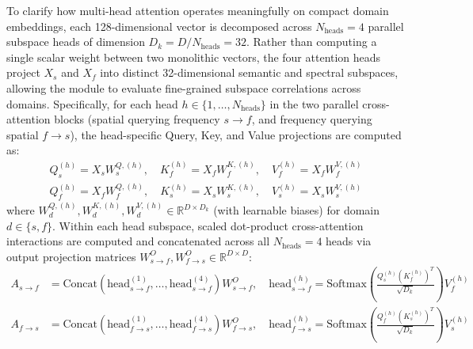 \documentclass[fleqn,10pt]{wlscirep}
\begin{document}
To clarify how multi-head attention operates meaningfully on compact domain embeddings, each 128-dimensional vector is decomposed across $N_{\text{heads}} = 4$ parallel subspace heads of dimension $D_k = D / N_{\text{heads}} = 32$. Rather than computing a single scalar weight between two monolithic vectors, the four attention heads project $X_s$ and $X_f$ into distinct 32-dimensional semantic and spectral subspaces, allowing the module to evaluate fine-grained subspace correlations across domains. Specifically, for each head $h \in \{1, \dots, N_{\text{heads}}\}$ in the two parallel cross-attention blocks (spatial querying frequency $s \to f$, and frequency querying spatial $f \to s$), the head-specific Query, Key, and Value projections are computed as:
\begin{align}
Q_s^{(h)} = X_s W_s^{Q,(h)}, \quad K_f^{(h)} = X_f W_f^{K,(h)}, \quad V_f^{(h)} = X_f W_f^{V,(h)} \\
Q_f^{(h)} = X_f W_f^{Q,(h)}, \quad K_s^{(h)} = X_s W_s^{K,(h)}, \quad V_s^{(h)} = X_s W_s^{V,(h)}
\end{align}
where $W_d^{Q,(h)}, W_d^{K,(h)}, W_d^{V,(h)} \in \mathbb{R}^{D \times D_k}$ (with learnable biases) for domain $d \in \{s, f\}$. Within each head subspace, scaled dot-product cross-attention interactions are computed and concatenated across all $N_{\text{heads}} = 4$ heads via output projection matrices $W_{s \to f}^O, W_{f \to s}^O \in \mathbb{R}^{D \times D}$:
\begin{align}
A_{s \to f} &= \text{Concat}\left(\text{head}_{s \to f}^{(1)}, \dots, \text{head}_{s \to f}^{(4)}\right) W_{s \to f}^O, \quad \text{head}_{s \to f}^{(h)} = \text{Softmax}\left(\frac{Q_s^{(h)} \left(K_f^{(h)}\right)^T}{\sqrt{D_k}}\right) V_f^{(h)} \\
A_{f \to s} &= \text{Concat}\left(\text{head}_{f \to s}^{(1)}, \dots, \text{head}_{f \to s}^{(4)}\right) W_{f \to s}^O, \quad \text{head}_{f \to s}^{(h)} = \text{Softmax}\left(\frac{Q_f^{(h)} \left(K_s^{(h)}\right)^T}{\sqrt{D_k}}\right) V_s^{(h)}
\end{align}
\end{document}
